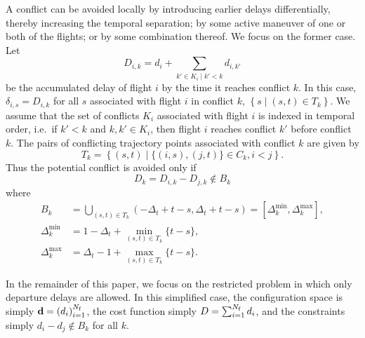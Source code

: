 A conflict can be avoided locally by introducing earlier delays differentially, thereby increasing the temporal separation; by some active maneuver of one or both of the flights; or by some combination thereof.
We focus on the former case.
Let 
\begin{equation}
\label{eq:accum-delay}
D_{i, k} = d_i + \sum_{\left.k' \in K_i \middle| k' < k\right.} d_{i,k'}
\end{equation}
be the accumulated delay of flight $i$ by the time it reaches conflict $k$.
In this case, $\delta_{i, s} = D_{i, k}$ for all $s$ associated with flight $i$ in conflict $k$, $\left\{ s \middle| (s, t) \in T_k\right\}$.
We assume that the set of conflicts $K_i$ associated with flight $i$ is indexed in temporal order, i.e.\ if $k' < k$ and $k, k' \in K_i$, then flight $i$ reaches conflict $k'$ before conflict $k$.
The pairs of conflicting trajectory points associated with conflict $k$ are given by 
\begin{equation}
T_k = 
\left\{
(s, t) \middle| \{(i, s), (j, t)\} \in C_k, i < j
\right\}.
\end{equation}
Thus the potential conflict is avoided only if 
\begin{equation}
\label{eq:accum-delay-diff}
D_k = D_{i, k} - D_{j, k}
\notin
B_k 
\end{equation}
where 
\begin{align}
B_k &= 
\bigcup_{(s, t) \in T_k}
\left(-\Delta_t + t - s, \Delta_t + t - s\right)
=
[\Delta^{\min}_k, \Delta^{\max}_k], \\
\Delta^{\min}_k &= 1 - \Delta_t + \min_{(s, t) \in T_k} \{t - s\},\\
\Delta^{\max}_k &= \Delta_t - 1 + \max_{(s, t) \in T_k} \{t - s\}.
\end{align}


In the remainder of this paper, we focus on the restricted problem in which only departure delays are allowed.
In this simplified case, the configuration space is simply 
$\mathbf d = {\left(d_i\right)}_{i=1}^{N_{\mathrm{f}}}$, the cost function simply $D = \sum_{i = 1}^{N_{\mathrm{f}}} d_i$, and the constraints simply $d_i - d_j \notin B_k$ for all $k$.
